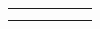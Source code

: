 {{\begin{center}
\begin{xtabular}[t]{|l|l|l|l|l|l|}
    
         &
    
    
         &
    
    
         &
    
    
         &
    
    
         &
    
    
     \tabularnewline{}
    
    
         &
    
    
         &
    
    
         &
    

\end{xtabular}
\end{center}}}
